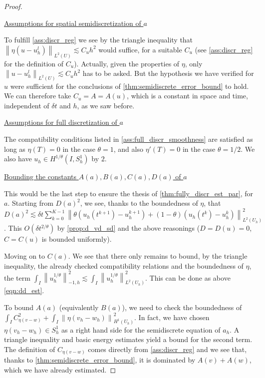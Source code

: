 \documentclass[english,a4paper,9pt,oneside]{scrbook}	%
\theoremstyle{break}
\newenvironment{mproof}[1][\proofname]{%
  \begin{proof}[#1]$ $\par\nobreak\ignorespaces
}{%
  \end{proof}
}
\renewcommand*{\proofname}{Proof}
\theoremstyle{remark}
\newcommand{\ds}{\displaystyle}
\newcommand{\norm}[1]{\left\lVert#1\right\rVert}
\begin{document}
\begin{mproof}
\underline{Assumptions for spatial semidiscretization of $a$}

To fulfill \cref{ass:discr_reg} we see by the triangle inequality that $\norm{\eta(u-u_h^l)}_{L^2(U)}\lesssim C_u h^2$ would suffice, for a suitable $C_u$ (see \cref{ass:discr_reg} for the definition of $C_u$). Actually, given the properties of $\eta$, only $\norm{u-u_h^l}_{L^2(U)}\lesssim C_u h^2$ has to be asked. But the hypothesis we have verified for $u$ were sufficient for the conclusions of \cref{thm:semidiscrete_error_bound} to hold. We can therefore take $C_u = A = A(u)$, which is a constant in space and time, independent of $\delta t$ and $h$, as we saw before.

\underline{Assumptions for full discretization of $a$}

The compatibility conditions listed in \cref{ass:full_discr_smoothness} are satisfied as long as $\eta(T)=0$ in the case $\theta = 1$, and also $\eta'(T)=0$ in the case $\theta=1/2$. We also have $u_h \in H^{1/\theta}(I,S^1_h)$ by $2$.

\underline{Bounding the constants $A(a),B(a),C(a),D(a)$ of $a$}

This would be the last step to ensure the thesis of \cref{thm:fully_discr_est_par}, for $a$. Starting from $D(a)^2$, we see, thanks to the boundedness of $\eta$, that $D(a)^2 \lesssim \delta t \sum_{k=0}^{K-1}\norm{\theta(u_h(t^{k+1})-u_h^{k+1}) + (1-\theta)(u_h(t^k)-u_h^k)}^2_{L^2(U_h)}$. This $O(\delta t^{2/\theta})$ by \cref{prop:d_vd_sd} and the above reasonings ($D=D(u)=0$, $C=C(u)$ is bounded uniformly).

Moving on to $C(a)$. We see that there only remains to bound, by the triangle inequality, the already checked compatibility relations and the boundedness of $\eta$, the term $\ds \int_I\norm{u_h^{1/\theta}}_{-1,h}^2\lesssim \int_I\norm{u_h^{1/\theta}}_{L^2(U_h)}^2$. This can be done as above \cref{eqn:dd_est}.

To bound $A(a)$ (equivalently $B(a)$), we need to check the boundedness of $\ds \int_IC_{\eta(v-w)}^2 + \int_I \norm{\eta(v_h - w_h)}_{H^1(U_h)}^2$. In fact, we have chosen $\eta(v_h - w_h) \in S^1_h$ as a right hand side for the semidiscrete equation of $a_h$. A triangle inequality and basic energy estimates yield a bound for the second term. The definition of $C_{\eta(v-w)}$ comes directly from \cref{ass:discr_reg} and we see that, thanks to \cref{thm:semidiscrete_error_bound}, it is dominated by $A(v)+A(w)$, which we have already estimated.

\end{mproof}
\end{document}
